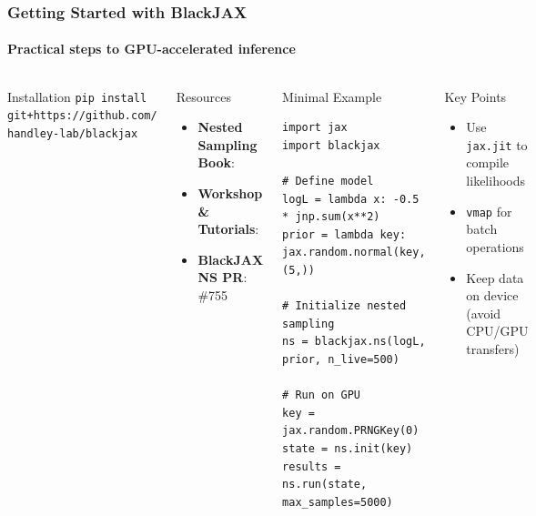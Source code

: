 \documentclass[aspectratio=169]{beamer}
\begin{document}
\begin{frame}[fragile]
    \frametitle{Getting Started with BlackJAX}
    \framesubtitle{Practical steps to GPU-accelerated inference}

    \begin{columns}
        \begin{block}{Installation}
            \small
            \texttt{pip install git+https://github.com/\\
            \hspace*{2em}handley-lab/blackjax}
        \end{block}

        \begin{block}{Resources}
            \small
            \begin{itemize}
                \item \textbf{Nested Sampling Book}: \\
                \item \textbf{Workshop \& Tutorials}: \\
                \item \textbf{BlackJAX NS PR}: \\
                     \#755
            \end{itemize}
        \end{block}

        \begin{block}{Minimal Example}
            \tiny
            \begin{verbatim}
import jax
import blackjax

# Define model
logL = lambda x: -0.5 * jnp.sum(x**2)
prior = lambda key: jax.random.normal(key, (5,))

# Initialize nested sampling
ns = blackjax.ns(logL, prior, n_live=500)

# Run on GPU
key = jax.random.PRNGKey(0)
state = ns.init(key)
results = ns.run(state, max_samples=5000)
            \end{verbatim}
        \end{block}

        \begin{alertblock}{Key Points}
            \tiny
            \begin{itemize}
                \item Use \texttt{jax.jit} to compile likelihoods
                \item \texttt{vmap} for batch operations
                \item Keep data on device (avoid CPU/GPU transfers)
            \end{itemize}
        \end{alertblock}
    \end{columns}
\end{frame}
\end{document}
